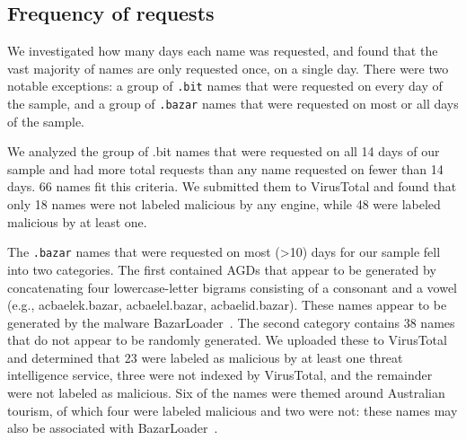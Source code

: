 \subsection{Frequency of requests}

We investigated how many days each name was requested, and found that the vast 
majority of names are only requested once, on a single day. There were two 
notable exceptions: a group of \texttt{.bit} names that were requested 
on every day of the sample, and a group of \texttt{.bazar} names that 
were requested on most or all days of the sample.

We analyzed the group of .bit names that were requested on all 14 days of our 
sample and had more total requests than any name requested on fewer than 14 
days. 66 names fit this criteria. We submitted them to VirusTotal and found 
that only 18 names were not labeled malicious by any engine, while 48 were 
labeled malicious by at least one. 

The \texttt{.bazar} names that were requested on most (>10) days for our sample 
fell into two categories. The first 
contained AGDs that appear to be generated by concatenating four 
lowercase-letter bigrams consisting of a consonant and a vowel (e.g., 
acbaelek.bazar, acbaelel.bazar, acbaelid.bazar). These names appear to be 
generated by the 
malware BazarLoader~\cite{bazarloader_dga}. The second category contains 38 
names that do not appear to be randomly generated. We uploaded these to 
VirusTotal and determined that 23 were labeled as malicious by at least one 
threat intelligence service, three were not indexed by VirusTotal, and the 
remainder were not labeled as malicious. Six of the names were themed around 
Australian tourism, of which four were labeled malicious and two were not: 
these names may also be associated with 
BazarLoader~\cite{alienvault_bazarloader}. 


%	
%	
